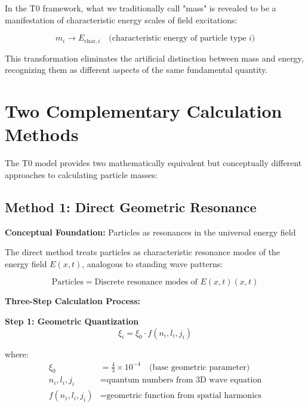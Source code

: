 \documentclass[12pt,a4paper]{report}
\newcommand{\Efield}{E(x,t)}              %
\begin{document}
In the T0 framework, what we traditionally call "mass" is revealed to be a manifestation of characteristic energy scales of field excitations:

\begin{equation}
	\boxed{m_i \rightarrow E_{\text{char},i} \quad \text{(characteristic energy of particle type } i\text{)}}
	\label{eq:mass_to_energy}
\end{equation}

This transformation eliminates the artificial distinction between mass and energy, recognizing them as different aspects of the same fundamental quantity.

\section{Two Complementary Calculation Methods}
\label{sec:two_calculation_methods}

The T0 model provides two mathematically equivalent but conceptually different approaches to calculating particle masses:

\subsection{Method 1: Direct Geometric Resonance}
\label{subsec:direct_geometric_method}

\textbf{Conceptual Foundation:} Particles as resonances in the universal energy field

The direct method treats particles as characteristic resonance modes of the energy field $\Efield$, analogous to standing wave patterns:

\begin{equation}
	\text{Particles} = \text{Discrete resonance modes of } \Efield(x,t)
\end{equation}

\textbf{Three-Step Calculation Process:}

\textbf{Step 1: Geometric Quantization}
\begin{equation}
	\xi_i = \xi_0 \cdot f(n_i, l_i, j_i)
	\label{eq:geometric_quantization}
\end{equation}

where:
\begin{align}
	\xi_0 &= \frac{4}{3} \times 10^{-4} \quad \text{(base geometric parameter)} \\
	n_i, l_i, j_i &= \text{quantum numbers from 3D wave equation} \\
	f(n_i, l_i, j_i) &= \text{geometric function from spatial harmonics}
\end{align}
\end{document}
